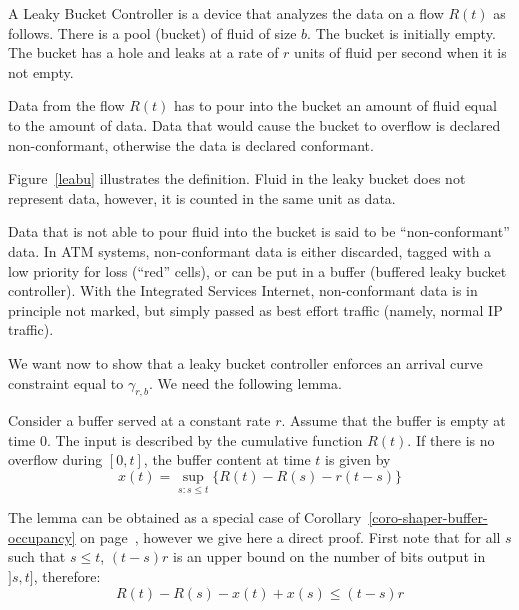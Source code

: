 \begin{definition} 
A Leaky Bucket Controller is a device that analyzes the data on a
flow $R(t)$ as follows. There is a pool (bucket) of fluid of size
$b$. The bucket is initially empty. The bucket has a hole and
leaks at a rate of $r$ units of fluid per second when it is not
empty.

Data from the flow $R(t)$ has to pour into the bucket an amount of
fluid equal to the amount of data. Data that would cause the
bucket to overflow is declared non-conformant, otherwise the data
is declared conformant.
\end{definition}
Figure~\ref{leabu} illustrates the definition.  Fluid in the leaky
bucket does not represent data, however, it is counted in the same
unit as data.

Data that is not able to pour fluid into the bucket is said to be
``non-conformant'' data. In ATM systems, non-conformant data is
either discarded, tagged with a low priority for loss (``red''
cells), or can be put in a buffer (buffered leaky bucket
controller). With the Integrated Services Internet, non-conformant
data is in principle not marked, but simply passed as best effort
traffic (namely, normal IP traffic).
\begin{figure}[!htbp]
\end{figure}

We want now to show that a leaky bucket controller enforces an
arrival curve constraint equal to $\gamma_{r,b}$. We need the
following lemma.
\begin{lemma}
        Consider a buffer served at a constant rate $r$. Assume that the
        buffer is empty at time $0$. The input is described by the cumulative
        function $R(t)$. If there is no overflow during $[0,t]$, the buffer
        content at time $t$ is given by
        $$
        x(t)=\sup_{s : s \leq t} \{ R(t) - R(s) -r (t-s)\}
        $$
\end{lemma}
\pr The lemma can be obtained as a special case of
Corollary~\ref{coro-shaper-buffer-occupancy} on
page~\pageref{coro-shaper-buffer-occupancy}, however we give here
a direct proof. First note that for all $s$ such that $s\leq t$,
$(t-s)r$ is an upper bound on the number of bits output in
$]s,t]$, therefore:
$$
R(t)-R(s) - x(t) +x(s) \leq (t-s)r
$$

